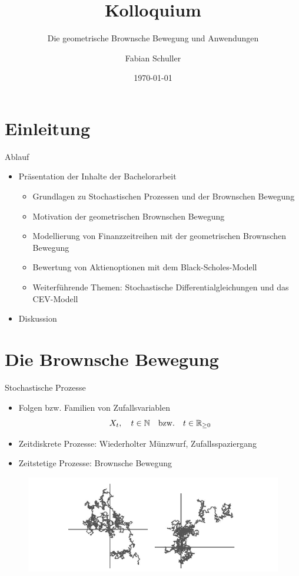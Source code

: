 \documentclass{beamer}
\title[Kolloquium]{Kolloquium}
\subtitle[Die geometrische Brownsche Bewegung und Anwendungen]{Die geometrische Brownsche Bewegung und Anwendungen}
\author{Fabian Schuller}
\date{\today}
\begin{document}
\section{Einleitung}

\begin{frame}
  \titlepage
\end{frame}

\begin{frame}{Ablauf}
  \begin{itemize}
    \item Präsentation der Inhalte der Bachelorarbeit
    \begin{itemize}
      \item Grundlagen zu Stochastischen Prozessen und der Brownschen Bewegung
      \item Motivation der geometrischen Brownschen Bewegung
      \item Modellierung von Finanzzeitreihen mit der geometrischen Brownschen Bewegung
      \item Bewertung von Aktienoptionen mit dem Black-Scholes-Modell
      \item Weiterführende Themen: Stochastische Differentialgleichungen und das CEV-Modell
    \end{itemize}
    \item Diskussion
  \end{itemize}
\end{frame}

\section{Die Brownsche Bewegung}

\begin{frame}{Stochastische Prozesse}
    \begin{itemize}
      \item Folgen bzw. Familien von Zufallsvariablen $$X_t,\quad t \in \Bbb N \quad \mathrm{ bzw. } \quad  t \in \Bbb R_{\ge 0}$$
      \item Zeitdiskrete Prozesse: Wiederholter Münzwurf, Zufallsspaziergang
      \item Zeitstetige Prozesse: Brownsche Bewegung
    \end{itemize}
    \begin{figure}
      \centering
      \includegraphics[width=1\textwidth]{images/bb_2d.png}
    \end{figure}
\end{frame}
\end{document}

